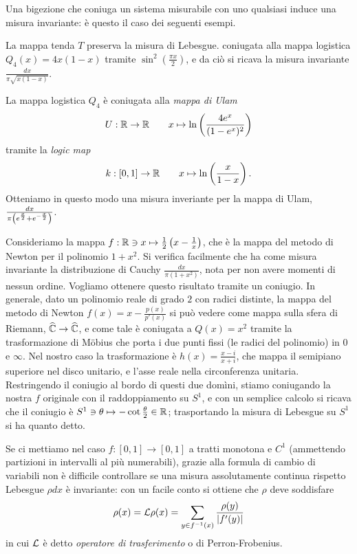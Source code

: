 Una bigezione che coniuga un sistema misurabile con uno qualsiasi induce una misura invariante: è questo il caso dei seguenti esempi.

\begin{esempio} La mappa tenda $T$ preserva la misura di Lebesgue. \Eacc coniugata alla mappa logistica $Q_4(x)=4x(1-x)$ tramite $\sin^2\left(\frac{\pi x}{2}\right)$,
 e da ciò si ricava la misura invariante $\frac{dx}{\pi\sqrt{x(1-x)}}$. 
\end{esempio}

\begin{esempio} La mappa logistica $Q_4$ è coniugata alla \emph{mappa di Ulam} 
 \[U:\mathbb{R}\rightarrow\mathbb{R} \qquad x\mapsto \ln \left(\frac{4 e^x}{(1-e^x)^2}\right)\]
tramite la \emph{logic map}
 \[k:[0,1]\rightarrow \mathbb{R} \qquad x\mapsto \ln\left(\frac{x}{1-x}\right). \]
Otteniamo in questo modo una misura inveriante per la mappa di Ulam, $\frac{dx}{\pi \left(e^{\frac{x}{2}}+e^{-\frac{x}{2}}\right)}$.
\end{esempio}

\begin{esempio} Consideriamo la mappa $f:\mathbb{R}\ni x\mapsto \frac{1}{2}\left(x-\frac{1}{x}\right)$, che è la mappa del metodo di Newton per il polinomio $1+x^2$. 
Si verifica facilmente che ha come misura invariante la distribuzione di Cauchy $\frac{dx}{\pi (1+x^2)}$, nota per non avere momenti di nessun ordine. 
Vogliamo ottenere questo risultato tramite un coniugio. 
In generale, dato un polinomio reale di grado $2$ con radici distinte, la mappa del metodo di Newton $f(x)=x-\frac{p(x)}{p'(x)}$ 
si può vedere come mappa sulla sfera di Riemann, $\widehat {\mathbb{C}}\rightarrow\widehat{\mathbb{C}}$, e come tale è coniugata a $Q(x)=x^2$ tramite la trasformazione di M\"obius che porta i due punti
fissi (le radici del polinomio) in $0$ e $\infty$. Nel nostro caso la trasformazione è $h(x)=\frac{x-i}{x+i}$, che mappa il semipiano superiore nel disco unitario, e l'asse reale
nella circonferenza unitaria. Restringendo il coniugio al bordo di questi due domìni, stiamo coniugando la nostra $f$ originale con il raddoppiamento su $S^1$, 
e con un semplice calcolo si ricava che il coniugio è $S^1\ni\theta\mapsto -\cot \frac{\theta}{2}\in\mathbb{R}$; trasportando la misura di Lebesgue su $S^1$ si ha quanto detto. 
\end{esempio}

Se ci mettiamo nel caso $f:[0,1]\rightarrow [0,1]$ a tratti monotona e $C^1$ (ammettendo partizioni in intervalli al più numerabili), grazie alla formula di cambio di variabili
non è difficile controllare se una misura assolutamente continua rispetto Lebesgue $\rho dx$ è invariante: con un facile conto si ottiene che $\rho$ deve soddisfare
\[\rho(x)=\mathcal{L}\rho(x)=\sum_{y\in f^{-1}(x)} \frac{\rho(y)}{|f'(y)|}\]
in cui $\mathcal{L}$ è detto \emph{operatore di trasferimento} o di Perron-Frobenius.

